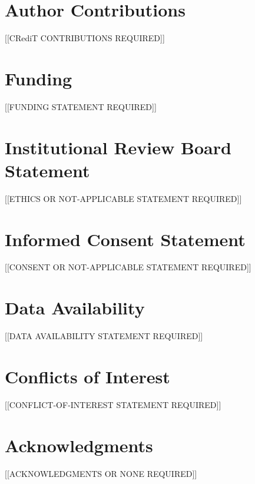 \documentclass[12pt]{article}
\begin{document}
\section*{Author Contributions}
[[CRediT CONTRIBUTIONS REQUIRED]]

\section*{Funding}
[[FUNDING STATEMENT REQUIRED]]

\section*{Institutional Review Board Statement}
[[ETHICS OR NOT-APPLICABLE STATEMENT REQUIRED]]

\section*{Informed Consent Statement}
[[CONSENT OR NOT-APPLICABLE STATEMENT REQUIRED]]

\section*{Data Availability}
[[DATA AVAILABILITY STATEMENT REQUIRED]]

\section*{Conflicts of Interest}
[[CONFLICT-OF-INTEREST STATEMENT REQUIRED]]

\section*{Acknowledgments}
[[ACKNOWLEDGMENTS OR NONE REQUIRED]]



\end{document}
